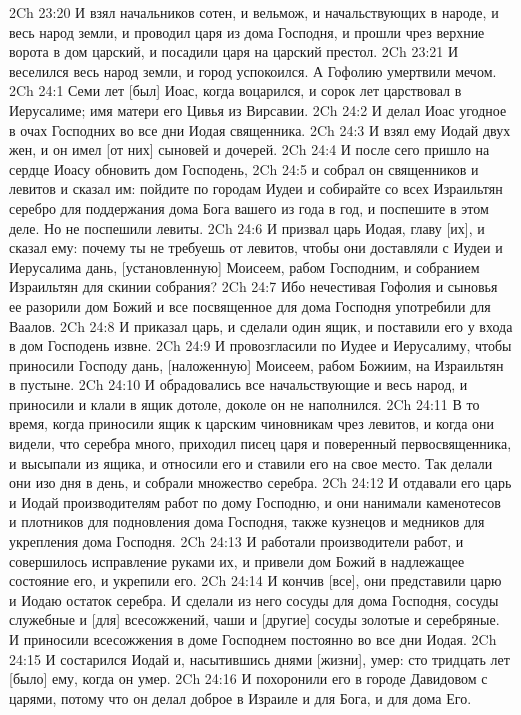 2Ch 23:20  И взял начальников сотен, и вельмож, и начальствующих в народе, и весь народ земли, и проводил царя из дома Господня, и прошли чрез верхние ворота в дом царский, и посадили царя на царский престол.
2Ch 23:21  И веселился весь народ земли, и город успокоился. А Гофолию умертвили мечом.
2Ch 24:1  Семи лет [был] Иоас, когда воцарился, и сорок лет царствовал в Иерусалиме; имя матери его Цивья из Вирсавии.
2Ch 24:2  И делал Иоас угодное в очах Господних во все дни Иодая священника.
2Ch 24:3  И взял ему Иодай двух жен, и он имел [от них] сыновей и дочерей.
2Ch 24:4  И после сего пришло на сердце Иоасу обновить дом Господень,
2Ch 24:5  и собрал он священников и левитов и сказал им: пойдите по городам Иудеи и собирайте со всех Израильтян серебро для поддержания дома Бога вашего из года в год, и поспешите в этом деле. Но не поспешили левиты.
2Ch 24:6  И призвал царь Иодая, главу [их], и сказал ему: почему ты не требуешь от левитов, чтобы они доставляли с Иудеи и Иерусалима дань, [установленную] Моисеем, рабом Господним, и собранием Израильтян для скинии собрания?
2Ch 24:7  Ибо нечестивая Гофолия и сыновья ее разорили дом Божий и все посвященное для дома Господня употребили для Ваалов.
2Ch 24:8  И приказал царь, и сделали один ящик, и поставили его у входа в дом Господень извне.
2Ch 24:9  И провозгласили по Иудее и Иерусалиму, чтобы приносили Господу дань, [наложенную] Моисеем, рабом Божиим, на Израильтян в пустыне.
2Ch 24:10  И обрадовались все начальствующие и весь народ, и приносили и клали в ящик дотоле, доколе он не наполнился.
2Ch 24:11  В то время, когда приносили ящик к царским чиновникам чрез левитов, и когда они видели, что серебра много, приходил писец царя и поверенный первосвященника, и высыпали из ящика, и относили его и ставили его на свое место. Так делали они изо дня в день, и собрали множество серебра.
2Ch 24:12  И отдавали его царь и Иодай производителям работ по дому Господню, и они нанимали каменотесов и плотников для подновления дома Господня, также кузнецов и медников для укрепления дома Господня.
2Ch 24:13  И работали производители работ, и совершилось исправление руками их, и привели дом Божий в надлежащее состояние его, и укрепили его.
2Ch 24:14  И кончив [все], они представили царю и Иодаю остаток серебра. И сделали из него сосуды для дома Господня, сосуды служебные и [для] всесожжений, чаши и [другие] сосуды золотые и серебряные. И приносили всесожжения в доме Господнем постоянно во все дни Иодая.
2Ch 24:15  И состарился Иодай и, насытившись днями [жизни], умер: сто тридцать лет [было] ему, когда он умер.
2Ch 24:16  И похоронили его в городе Давидовом с царями, потому что он делал доброе в Израиле и для Бога, и для дома Его.
